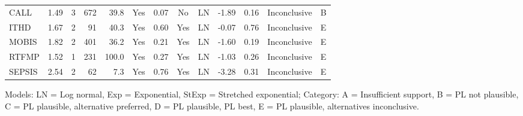 \begin{tabular}{lrrrrcrclrrll}
CALL & 1.49 & 3 & 672 & 39.8 & Yes & 0.07 & No & LN & -1.89 & 0.16 & Inconclusive & \cellcolor[HTML]{D55E00} B \\
ITHD & 1.67 & 2 & 91 & 40.3 & Yes & 0.60 & Yes & LN & -0.07 & 0.76 & Inconclusive & \cellcolor[HTML]{56B4E9} E \\
MOBIS & 1.82 & 2 & 401 & 36.2 & Yes & 0.21 & Yes & LN & -1.60 & 0.19 & Inconclusive & \cellcolor[HTML]{56B4E9} E \\
RTFMP & 1.52 & 1 & 231 & 100.0 & Yes & 0.27 & Yes & LN & -1.03 & 0.26 & Inconclusive & \cellcolor[HTML]{56B4E9} E \\
SEPSIS & 2.54 & 2 & 62 & 7.3 & Yes & 0.76 & Yes & LN & -3.28 & 0.31 & Inconclusive & \cellcolor[HTML]{56B4E9} E \\
\bottomrule
\end{tabular}
\begin{center}\footnotesize
Models: LN = Log normal, Exp = Exponential, StExp = Stretched exponential; \quad Category: A = Insufficient support, B = PL not plausible, C = PL plausible, alternative preferred, D = PL plausible, PL best, E = PL plausible, alternatives inconclusive.
\end{center}

